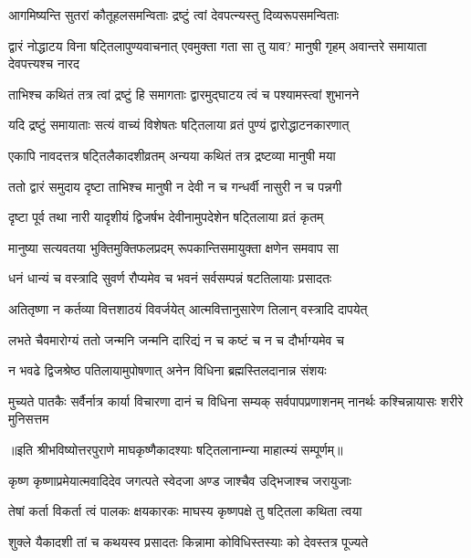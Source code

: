 \twolineshloka
{आगमिष्यन्ति सुतरां कौतूहलसमन्विताः}
{द्रष्टुं त्वां देवपत्न्यस्तु दिव्यरूपसमन्विताः} %


\threelineshloka
{द्वारं नोद्धाटय विना षट्तिलापुण्यवाचनात्}
{एवमुक्ता गता सा तु याव? मानुषी गृहम्}
{अवान्तरे समायाता देवपत्त्यश्च नारद} %

\twolineshloka
{ताभिश्च कथितं तत्र त्वां द्रष्टुं हि समागताः}
{द्वारमुद्घाटय त्वं च पश्यामस्त्वां शुभानने} %


\twolineshloka
{यदि द्रष्टुं समायाताः सत्यं वाच्यं विशेषतः}
{षट्तिलाया व्रतं पुण्यं द्वारोद्धाटनकारणात्} %

\twolineshloka
{एकापि नावदत्तत्र षट्तिलैकादशीव्रतम्}
{अन्यया कथितं तत्र द्रष्टव्या मानुषी मया} %

\twolineshloka
{ततो द्वारं समुदाय दृष्टा ताभिश्च मानुषी}
{न देवी न च गन्धर्वी नासुरी न च पन्नगी} %

\twolineshloka
{दृष्टा पूर्व तथा नारी यादृशीयं द्विजर्षभ}
{देवीनामुपदेशेन षट्तिलाया व्रतं कृतम्} %

\twolineshloka
{मानुष्या सत्यवतया भुक्तिमुक्तिफलप्रदम्}
{रूपकान्तिसमायुक्ता क्षणेन समवाप सा} %

\twolineshloka
{धनं धान्यं च वस्त्रादि सुवर्ण रौप्यमेव च}
{भवनं सर्वसम्पन्नं षटतिलायाः प्रसादतः} %

\twolineshloka
{अतितृष्णा न कर्तव्या वित्तशाठयं विवर्जयेत्}
{आत्मवित्तानुसारेण तिलान् वस्त्रादि दापयेत्} %

\twolineshloka
{लभते चैवमारोग्यं ततो जन्मनि जन्मनि}
{दारिद्यं न च कष्टं च न च दौर्भाग्यमेव च} %

\twolineshloka
{न भवढे द्विजश्रेष्ठ पतिलायामुपोषणात्}
{अनेन विधिना ब्रह्मस्तिलदानान्न संशयः} %

\threelineshloka
{मुच्यते पातकैः सर्वैर्नात्र कार्या विचारणा}
{दानं च विधिना सम्यक् सर्वपापप्रणाशनम्}
{नानर्थः कश्चिन्नायासः शरीरे मुनिसत्तम} %

॥इति श्रीभविष्योत्तरपुराणे माघकृष्णैकादश्याः षट्तिलानाम्न्या माहात्म्यं सम्पूर्णम्॥



\twolineshloka
{कृष्ण कृष्णाप्रमेयात्मवादिदेव जगत्पते}
{स्वेदजा अण्ड जाश्चैव उद्भिजाश्च जरायुजाः} %

\twolineshloka
{तेषां कर्ता विकर्ता त्वं पालकः क्षयकारकः}
{माघस्य कृष्णपक्षे तु षट्तिला कथिता त्वया} %

\twolineshloka
{शुक्ले यैकादशी तां च कथयस्व प्रसादतः}
{किन्नामा कोविधिस्तस्याः को देवस्तत्र पूज्यते} %

